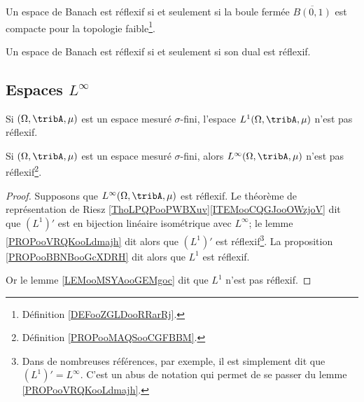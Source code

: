 \begin{theorem}       \label{THOooTFIHooPQjVAr}
	Un espace de Banach est réflexif si et seulement si la boule fermée \( \overline{ B(0,1) }\) est compacte pour la topologie faible\footnote{Définition \ref{DEFooZGLDooRRarRj}.}.
\end{theorem}

\begin{proposition}       \label{PROPooBBNBooGcXDRH}
	Un espace de Banach est réflexif si et seulement si son dual est réflexif.
\end{proposition}

\subsection{Espaces \texorpdfstring{\(  L^{\infty}\)}{Linfinity}}

\begin{lemma}        \label{LEMooMSYAooGEMgoc}
	Si \( (\Omega,\tribA,\mu)\) est un espace mesuré \( \sigma\)-fini, l'espace \( L^1(\Omega,\tribA,\mu)\) n'est pas réflexif.
\end{lemma}

\begin{lemma}     \label{LEMooUSXTooFvpsVd}
	Si \( (\Omega,\tribA,\mu)\) est un espace mesuré \( \sigma\)-fini, alors \( L^{\infty}(\Omega,\tribA,\mu)\) n'est pas réflexif\footnote{Définition \ref{PROPooMAQSooCGFBBM}.}.
\end{lemma}

\begin{proof}
	Supposons que \( L^{\infty}(\Omega,\tribA,\mu)\) est réflexif. Le théorème de représentation de Riesz \ref{ThoLPQPooPWBXuv}\ref{ITEMooCQGJooOWzjoV} dit que \( (L^1)'\) est en bijection linéaire isométrique avec \( L^{\infty}\); le lemme \ref{PROPooVRQKooLdmajh} dit alors que \( (L^1)'\) est réflexif\footnote{Dans de nombreuses références, par exemple\cite{BIBooFDGQooYferue}, il est simplement dit que \( (L^1)'=L^{\infty}\). C'est un abus de notation qui permet de se passer du lemme \ref{PROPooVRQKooLdmajh}.}. La proposition \ref{PROPooBBNBooGcXDRH} dit alors que \( L^1\) est réflexif.

	Or le lemme \ref{LEMooMSYAooGEMgoc} dit que \( L^1\) n'est pas réflexif.
\end{proof}



